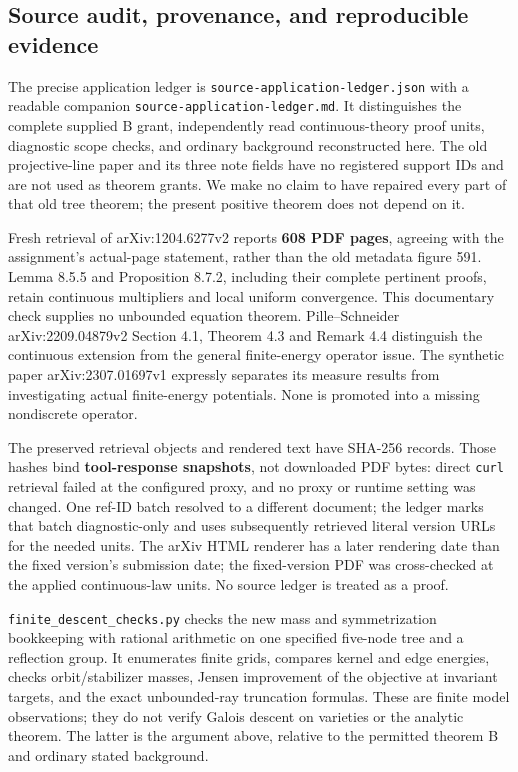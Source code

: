 \documentclass[
  11pt,
]{article}
\begin{document}
\subsection{Source audit, provenance, and reproducible
evidence}\label{source-audit-provenance-and-reproducible-evidence}

The precise application ledger is
\texttt{source-application-ledger.json} with a readable companion
\texttt{source-application-ledger.md}. It distinguishes the complete
supplied B grant, independently read continuous-theory proof units,
diagnostic scope checks, and ordinary background reconstructed here. The
old projective-line paper and its three note fields have no registered
support IDs and are not used as theorem grants. We make no claim to have
repaired every part of that old tree theorem; the present positive
theorem does not depend on it.

Fresh retrieval of arXiv:1204.6277v2 reports \textbf{608 PDF pages},
agreeing with the assignment's actual-page statement, rather than the
old metadata figure 591. Lemma 8.5.5 and Proposition 8.7.2, including
their complete pertinent proofs, retain continuous multipliers and local
uniform convergence. This documentary check supplies no unbounded
equation theorem. Pille--Schneider arXiv:2209.04879v2 Section 4.1,
Theorem 4.3 and Remark 4.4 distinguish the continuous extension from the
general finite-energy operator issue. The synthetic paper
arXiv:2307.01697v1 expressly separates its measure results from
investigating actual finite-energy potentials. None is promoted into a
missing nondiscrete operator.

The preserved retrieval objects and rendered text have SHA-256 records.
Those hashes bind \textbf{tool-response snapshots}, not downloaded PDF
bytes: direct \texttt{curl} retrieval failed at the configured proxy,
and no proxy or runtime setting was changed. One ref-ID batch resolved
to a different document; the ledger marks that batch diagnostic-only and
uses subsequently retrieved literal version URLs for the needed units.
The arXiv HTML renderer has a later rendering date than the fixed
version's submission date; the fixed-version PDF was cross-checked at
the applied continuous-law units. No source ledger is treated as a
proof.

\texttt{finite\_descent\_checks.py} checks the new mass and
symmetrization bookkeeping with rational arithmetic on one specified
five-node tree and a reflection group. It enumerates finite grids,
compares kernel and edge energies, checks orbit/stabilizer masses,
Jensen improvement of the objective at invariant targets, and the exact
unbounded-ray truncation formulas. These are finite model observations;
they do not verify Galois descent on varieties or the analytic theorem.
The latter is the argument above, relative to the permitted theorem B
and ordinary stated background.
\end{document}
